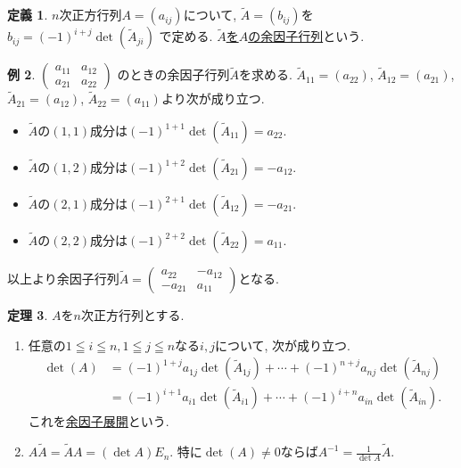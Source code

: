 \documentclass[dvipdfmx,a4paper,11pt]{article}
\theoremstyle{definition}
\newtheorem{thm}{定理}
\newtheorem{dfn}[thm]{定義}
\newtheorem{exa}[thm]{例}
\begin{document}
\begin{tcolorbox}[
    colback = white,
    colframe = green!35!black,
    fonttitle = \bfseries,
    breakable = true]
    \begin{dfn}
    $n$次正方行列$A=(a_{ij})$について, $\tilde{A} =(b_{ij})$を
    \underline{$
    b_{ij} = (-1)^{i+j} \det(\tilde{A}_{ji})$}
    で定める.
 \underline{$\tilde{A}$を$A$の余因子行列}という.
    \end{dfn}
 \end{tcolorbox}
\begin{exa}
\label{inverse_2}
$
\begin{pmatrix}
a_{11} & a_{12} \\
a_{21} & a_{22}
\end{pmatrix}
$
のときの余因子行列$\tilde{A} $を求める.
$  \tilde{A}_{11} =(a_{22})$, $  \tilde{A}_{12} =(a_{21})$, $  \tilde{A}_{21} =(a_{12})$, $  \tilde{A}_{22} =(a_{11})$より次が成り立つ.
\begin{itemize}
\item $\tilde{A} $の$(1,1)$成分は$(-1)^{1+1}\det( \tilde{A}_{11}) = a_{22}$.
\item $\tilde{A} $の$(1,2)$成分は$(-1)^{1+2}\det( \tilde{A}_{21}) = -a_{12}$.
\item $\tilde{A} $の$(2,1)$成分は$(-1)^{2+1}\det( \tilde{A}_{12}) = -a_{21}$.
\item $\tilde{A} $の$(2,2)$成分は$(-1)^{2+2}\det( \tilde{A}_{22}) = a_{11}$.
\end{itemize}
以上より余因子行列$\tilde{A} = 
\begin{pmatrix}
a_{22} &- a_{12} \\
-a_{21} & a_{11}
\end{pmatrix}$となる.
\end{exa}


\begin{tcolorbox}[
    colback = white,
    colframe = green!35!black,
    fonttitle = \bfseries,
    breakable = true]
    \begin{thm}
 $A$を$n$次正方行列とする.
 \begin{enumerate}
\item %
任意の$1 \leqq i \leqq n, 1 \leqq j\leqq n$なる$i,j$について, 次が成り立つ.
 \begin{align*}
 \det(A) & =(-1)^{1+j}a_{1j}\det(\tilde{A}_{1j}) + \cdots +(-1)^{n+j}a_{nj}\det(\tilde{A}_{nj}) 
 \\
 &=(-1)^{i+1}a_{i1}\det(\tilde{A}_{i1}) + \cdots +(-1)^{i+n}a_{in}\det(\tilde{A}_{in}).
  \end{align*}
  これを\underline{余因子展開}という.
 \item $A\tilde{A} = \tilde{A}A =(\det A)E_n$. 特に$\det(A)\neq0$ならば$A^{-1} = \frac{1}{\det A} \tilde{A}$.
 \end{enumerate}
     \end{thm}
 \end{tcolorbox}
\end{document}
